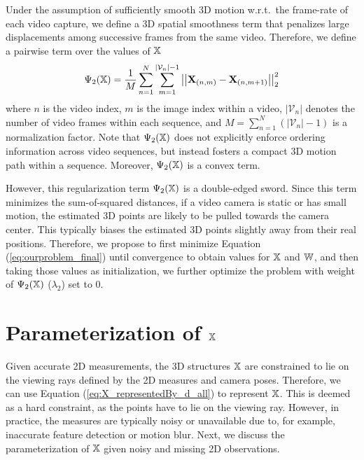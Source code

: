 Under the assumption of sufficiently smooth 3D motion w.r.t.~the frame-rate of each video capture, we define a 3D spatial smoothness term that penalizes large displacements among successive frames from the same video.
Therefore, we define a pairwise term over the values of $\mathbb X$
\begin{equation}
\Psi_2(\mathbb X) = \frac{1}{M} \sum_{n=1}^{N}\sum_{m=1}^{\vert\mathcal V_n\vert-1}\left|\left|\mathbf X_{(n,m)} - \mathbf X_{(n,m+1)} \right| \right|_2^2
\end{equation}
where $n$ is the video index, $m$ is the image index within a video, $\vert \mathcal V_n\vert$ denotes the number of video frames within each sequence, and $M=\sum_{n=1}^{N}(\vert \mathcal V_n\vert - 1)$ is a normalization factor.
Note that $\Psi_2(\mathbb X)$ does not explicitly enforce ordering information across video sequences, but instead fosters a compact 3D motion path within a sequence.
Moreover,  $\Psi_2(\mathbb X)$ is a convex term.

However, this regularization term $\Psi_2(\mathbb X)$ is a double-edged sword.
Since this term minimizes the sum-of-squared distances, if a video camera is static or has small motion, the estimated 3D points are likely to be pulled towards the camera center. 
This typically biases the estimated 3D points slightly away from their real positions. 
Therefore, we propose to first minimize Equation (\ref{eq:ourproblem_final}) until convergence to obtain values for $\mathbb X$ and $\mathbb W$, and then taking those values as initialization, we further optimize the problem with weight of $\Psi_2(\mathbb X)$ (\ie $\lambda_2$) set to $0$.



\section{Parameterization of $\mathbb X$} \label{sec:parameterization}

Given accurate 2D measurements, 
the 3D structures $\mathbb X$ are constrained to lie on the viewing rays defined by the 2D measures and camera poses. Therefore, we can use Equation (\ref{eq:X_representedBy_d_all}) to represent $\mathbb X$. This is deemed as a hard constraint, as the points have to lie on the viewing ray. However, in practice, the measures are typically noisy or unavailable due to, for example, inaccurate feature detection or motion blur. 
Next, we discuss the parameterization of $\mathbb X$ given noisy and missing 2D observations.

